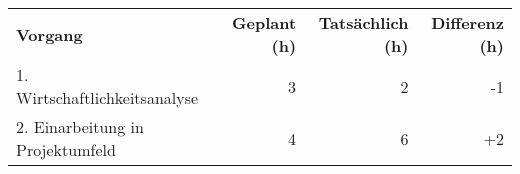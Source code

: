 \begin{tabularx}{\textwidth}{Xrrr}
    \rowcolor{KVGruen}\textbf{Vorgang} & \textbf{Geplant (h)} & \textbf{Tatsächlich (h)} & \textbf{Differenz (h)} \\
    1. Wirtschaftlichkeitsanalyse & 3 & 2 & -1 \\
    \rowcolor{KVGrau}2. Einarbeitung in Projektumfeld & 4   & 6   & +2 \\
\end{tabularx}
    
